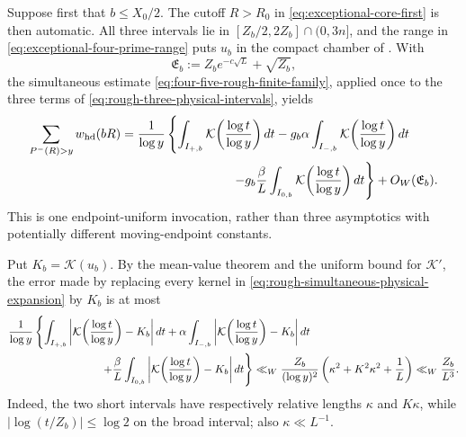 \documentclass[11pt]{article}
\numberwithin{equation}{section}
\theoremstyle{definition}
\theoremstyle{remark}
\newcommand{\1}{\mathbf 1}
\begin{document}
Suppose first that \(b\le X_0/2\).  The cutoff \(R>R_0\) in
\eqref{eq:exceptional-core-first} is then automatic.  All three intervals
lie in \([Z_b/2,2Z_b]\cap(0,3n]\), and the range in
\eqref{eq:exceptional-four-prime-range} puts \(u_b\) in the compact
chamber of .  With
\[
 \mathfrak E_b:=Z_be^{-c\sqrt L}+\sqrt{Z_b},
\]
the simultaneous estimate
\eqref{eq:four-five-rough-finite-family}, applied once to the three terms
of \eqref{eq:rough-three-physical-intervals}, yields
\begin{align}
 \sum_{P^-(R)>y}w_{\rm hd}(bR)
 &=\frac1{\log y}\left\{
   \int_{I_{+,b}}\mathcal K\!\left(\frac{\log t}{\log y}\right)dt
  -g_b\alpha\int_{I_{-,b}}
       \mathcal K\!\left(\frac{\log t}{\log y}\right)dt\right.\notag\\
 &\hspace{31mm}\left.
  -g_b\frac\beta L\int_{I_{0,b}}
       \mathcal K\!\left(\frac{\log t}{\log y}\right)dt
  \right\}+O_W(\mathfrak E_b).
 \label{eq:rough-simultaneous-physical-expansion}
\end{align}
This is one endpoint-uniform invocation, rather than three asymptotics
with potentially different moving-endpoint constants.

Put \(K_b=\mathcal K(u_b)\).  By the mean-value theorem and the uniform
bound for \(\mathcal K'\), the error made by replacing every kernel in
\eqref{eq:rough-simultaneous-physical-expansion} by \(K_b\) is at most
\begin{align}
 &\frac1{\log y}\left\{
   \int_{I_{+,b}}\left|\mathcal K\!\left(\frac{\log t}{\log y}\right)-K_b\right|dt
  +\alpha\int_{I_{-,b}}
       \left|\mathcal K\!\left(\frac{\log t}{\log y}\right)-K_b\right|dt\right.\notag\\
 &\hspace{29mm}\left.
  +\frac\beta L\int_{I_{0,b}}
       \left|\mathcal K\!\left(\frac{\log t}{\log y}\right)-K_b\right|dt
  \right\}
 \ll_W\frac{Z_b}{(\log y)^2}
       \left(\kappa^2+K^2\kappa^2+\frac1L\right)
 \ll_W\frac{Z_b}{L^3}.
 \label{eq:rough-physical-kernel-variation}
\end{align}
Indeed, the two short intervals have respectively relative lengths
\(\kappa\) and \(K\kappa\), while
\(|\log(t/Z_b)|\le\log2\) on the broad interval; also
\(\kappa\ll L^{-1}\).
\end{document}
